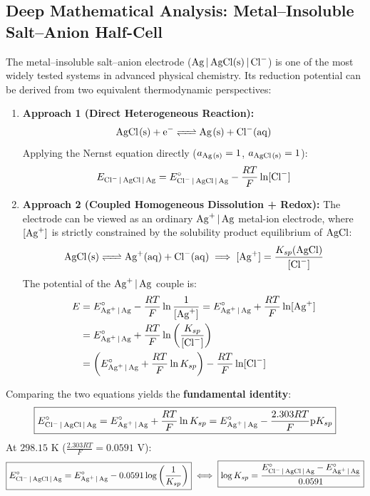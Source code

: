 \subsection{Deep Mathematical Analysis: Metal--Insoluble Salt--Anion Half-Cell}
The metal--insoluble salt--anion electrode ($\ce{Ag | AgCl(s) | Cl^-}$) is one of the most widely tested systems in advanced physical chemistry. Its reduction potential can be derived from two equivalent thermodynamic perspectives:

\begin{enumerate}[leftmargin=*]
    \item \textbf{Approach 1 (Direct Heterogeneous Reaction):}
    \begin{equation}
        \ce{AgCl(s) + e^- <=> Ag(s) + Cl^-(aq)}
    \end{equation}
    Applying the Nernst equation directly ($a_{\ce{Ag(s)}} = 1$, $a_{\ce{AgCl(s)}} = 1$):
    \begin{equation}
        E_{\ce{Cl^- | AgCl | Ag}} = E^\circ_{\ce{Cl^- | AgCl | Ag}} - \frac{RT}{F} \ln [\ce{Cl-}]
    \end{equation}

    \item \textbf{Approach 2 (Coupled Homogeneous Dissolution + Redox):}
    The electrode can be viewed as an ordinary $\ce{Ag+ | Ag}$ metal-ion electrode, where $[\ce{Ag+}]$ is strictly constrained by the solubility product equilibrium of $\ce{AgCl}$:
    \begin{equation}
        \ce{AgCl(s) <=> Ag+(aq) + Cl^-(aq)} \implies [\ce{Ag+}] = \frac{K_{sp}(\ce{AgCl})}{[\ce{Cl-}]}
    \end{equation}
    The potential of the $\ce{Ag+ | Ag}$ couple is:
    \begin{align}
        E &= E^\circ_{\ce{Ag+ | Ag}} - \frac{RT}{F} \ln \frac{1}{[\ce{Ag+}]} = E^\circ_{\ce{Ag+ | Ag}} + \frac{RT}{F} \ln [\ce{Ag+}] \notag \\
        &= E^\circ_{\ce{Ag+ | Ag}} + \frac{RT}{F} \ln \left( \frac{K_{sp}}{[\ce{Cl-}]} \right) \notag \\
        &= \left( E^\circ_{\ce{Ag+ | Ag}} + \frac{RT}{F} \ln K_{sp} \right) - \frac{RT}{F} \ln [\ce{Cl-}]
    \end{align}
\end{enumerate}

Comparing the two equations yields the \textbf{fundamental identity}:
\begin{equation}
    \boxed{E^\circ_{\ce{Cl^- | AgCl | Ag}} = E^\circ_{\ce{Ag+ | Ag}} + \frac{RT}{F} \ln K_{sp} = E^\circ_{\ce{Ag+ | Ag}} - \frac{2.303 RT}{F} \text{p}K_{sp}}
\end{equation}
At $298.15\text{ K}$ ($\frac{2.303 RT}{F} = 0.0591\text{ V}$):
\begin{equation}
    \boxed{E^\circ_{\ce{Cl^- | AgCl | Ag}} = E^\circ_{\ce{Ag+ | Ag}} - 0.0591 \log \left(\frac{1}{K_{sp}}\right)} \iff \boxed{\log K_{sp} = \frac{E^\circ_{\ce{Cl^- | AgCl | Ag}} - E^\circ_{\ce{Ag+ | Ag}}}{0.0591}}
\end{equation}

